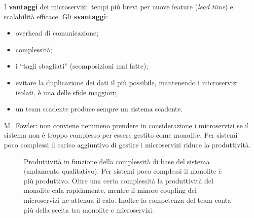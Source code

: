 I \textbf{vantaggi} dei microservizi: tempi più brevi per nuove feature (\emph{lead time}) e scalabilità efficace.
Gli \textbf{svantaggi}:
\begin{itemize}
  \item overhead di comunicazione;
  \item complessità;
  \item i ``tagli sbagliati'' (scomposizioni mal fatte);
  \item evitare la duplicazione dei dati il più possibile, mantenendo i microservizi isolati, è una delle sfide maggiori;
  \item un team scadente produce sempre un sistema scadente.
\end{itemize}

\begin{attenzione}
M.~Fowler: non conviene nemmeno prendere in considerazione i microservizi se il sistema non è troppo complesso per essere
gestito come monolite. Per sistemi poco complessi il carico aggiuntivo di gestire i microservizi riduce la produttività.
\end{attenzione}

\begin{figure}[ht]
\centering
{}
\caption{Produttività in funzione della complessità di base del sistema (andamento qualitativo).
Per sistemi poco complessi il monolite è più produttivo. Oltre una certa complessità la produttività del monolite
cala rapidamente, mentre il minore coupling dei microservizi ne attenua il calo. Inoltre la competenza del team conta
più della scelta tra monolite e microservizi.}
\label{fig:micro-produttivita}
\end{figure}

